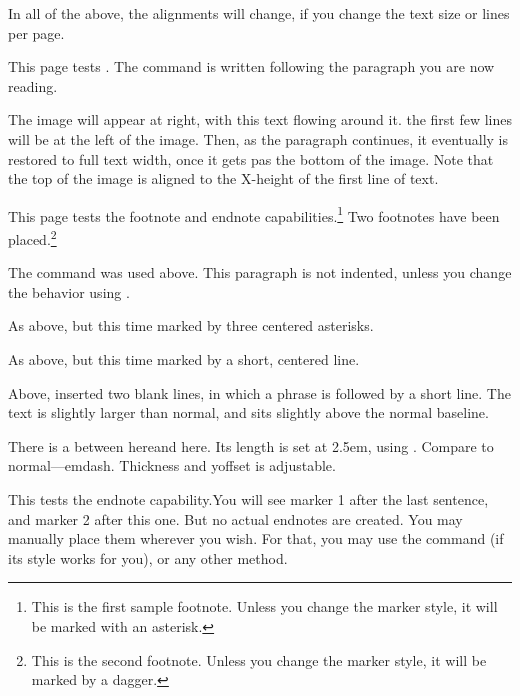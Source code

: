 \documentclass[test]{novel} %
\begin{document}
\null\null

In all of the above, the alignments will change, if you change the text size or lines per page.

\clearpage



This page tests \string\WrapImage. The command is written following the paragraph you are now reading.


The image will appear at right, with this text flowing around it. the first few lines will be at the left of the image. Then, as the paragraph continues, it eventually is restored to full text width, once it gets pas the bottom of the image. Note that the top of the image is aligned to the X-height of the first line of text.

\clearpage


This page tests the footnote and endnote capabilities.\footnote{This is the first sample footnote. Unless you change the marker style, it will be marked with an asterisk.} Two footnotes have been placed.\footnote{This is the second footnote. Unless you change the marker style, it will be marked by a dagger.}

\scenebreak

The \string\scenebreak\space command was used above. This paragraph is not indented, unless you change the behavior using \string\SetScenebreakIndent.

\scenestars

As above, but this time marked by three centered asterisks.

\sceneline

As above, but this time marked by a short, centered line.


Above, \string\QuickChapter\space inserted two blank lines, in which a phrase is followed by a short line. The text is slightly larger than normal, and sits slightly above the normal baseline.

\null

There is a \string\bigemdash\space between here\makebox[2.5em]{\bigemdash}and here. Its length is set at 2.5em, using \string\makebox. Compare to normal—emdash. Thickness and yoffset is adjustable.

\null

This tests the endnote capability.\endnote You will see marker 1 after the last sentence, and marker 2 after this one.\endnote{} But no actual endnotes are created. You may manually place them wherever you wish. For that, you may use the \string\endnotetext\space command (if its style works for you), or any other method.
\end{document}
